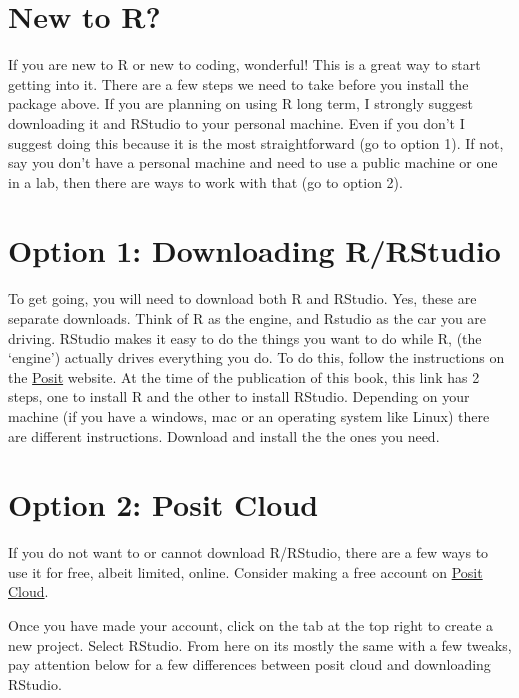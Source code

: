 \documentclass[
  letterpaper,
  DIV=11,
  numbers=noendperiod]{scrreprt}
\begin{document}
\section{New to R?}\label{new-to-r}

If you are new to R or new to coding, wonderful! This is a great way to
start getting into it. There are a few steps we need to take before you
install the package above. If you are planning on using R long term, I
strongly suggest downloading it and RStudio to your personal machine.
Even if you don't I suggest doing this because it is the most
straightforward (go to option 1). If not, say you don't have a personal
machine and need to use a public machine or one in a lab, then there are
ways to work with that (go to option 2).

\section{Option 1: Downloading
R/RStudio}\label{option-1-downloading-rrstudio}

To get going, you will need to download both R and RStudio. Yes, these
are separate downloads. Think of R as the engine, and Rstudio as the car
you are driving. RStudio makes it easy to do the things you want to do
while R, (the `engine') actually drives everything you do. To do this,
follow the instructions on the
\href{https://posit.co/download/rstudio-desktop/}{Posit} website. At the
time of the publication of this book, this link has 2 steps, one to
install R and the other to install RStudio. Depending on your machine
(if you have a windows, mac or an operating system like Linux) there are
different instructions. Download and install the the ones you need.

\section{Option 2: Posit Cloud}\label{option-2-posit-cloud}

If you do not want to or cannot download R/RStudio, there are a few ways
to use it for free, albeit limited, online. Consider making a free
account on
\href{https://login.posit.cloud/login?redirect=\%2Foauth\%2Fauthorize\%3Fredirect_uri\%3Dhttps\%253A\%252F\%252Fposit.cloud\%252Flogin\%26client_id\%3Dposit-cloud\%26response_type\%3Dcode\%26show_auth\%3D0&product=cloud}{Posit
Cloud}.

Once you have made your account, click on the tab at the top right to
create a new project. Select RStudio. From here on its mostly the same
with a few tweaks, pay attention below for a few differences between
posit cloud and downloading RStudio.
\end{document}
